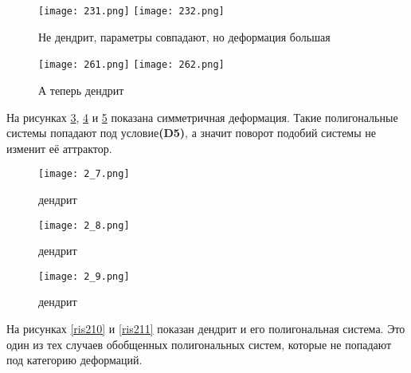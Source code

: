 \begin{figure}[h!]
\begin{center}
\begin{minipage}[h]{1\linewidth}
\texttt{[image: 231.png]}
\texttt{[image: 232.png]}
\caption{Не дендрит, параметры совпадают, но деформация большая } %
\label{ris43} %
\end{minipage}
\end{center}
\end{figure}

\begin{figure}[h!]
\begin{center}
\begin{minipage}[h]{1\linewidth}
\texttt{[image: 261.png]}
\texttt{[image: 262.png]}
\caption{А теперь дендрит}%
\label{ris46}%
\end{minipage}
\end{center}
\end{figure}

На рисунках \ref{ris27}, \ref{ris28} и \ref{ris29} показана симметричная деформация. Такие полигональные системы попадают под условие{\bf (D5)}, а значит поворот подобий системы не изменит её аттрактор.

\begin{figure}[h!]
\centering
\texttt{[image: 2\_7.png]}
\caption{дендрит} %
\label{ris27} %
\end{figure}

\newpage
\begin{figure}[h!]
\centering
\texttt{[image: 2\_8.png]}
\caption{дендрит}%
\label{ris28}%
\end{figure}

\begin{figure}[h!]
\centering
\texttt{[image: 2\_9.png]}
\caption{дендрит}%
\label{ris29}%
\end{figure}
\newpage

На рисунках \ref{ris210} и \ref{ris211} показан дендрит и его полигональная система. Это один из тех случаев обобщенных полигональных систем, которые не попадают под категорию деформаций.


